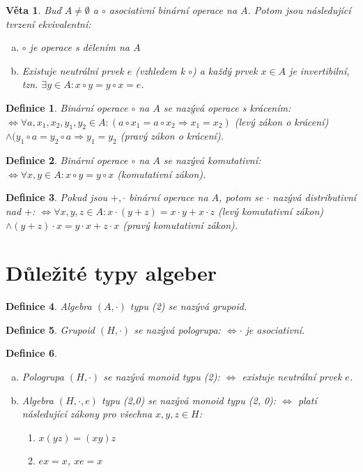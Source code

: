 \documentclass[a4paper, 11pt]{report}
\newtheorem{mydef}{Definice}[chapter]
\newtheorem{veta}{Věta}[chapter]
\begin{document}
\begin{veta}
Buď $A \not= \emptyset$ a $\circ$ asociativní binární operace na $A$. Potom jsou následující tvrzení ekvivalentní:
\begin{enumerate}[a)]
	\item $\circ$ je operace s dělením na $A$
	\item Existuje neutrální prvek $e$ (vzhledem k $\circ$) a každý prvek $x \in A$ je invertibilní, tzn. $\exists y \in A: x \circ y = y \circ x = e$.
\end{enumerate}
\end{veta}

\begin{mydef}
Binární operace $\circ$ na $A$ se nazývá operace s krácením: $\Leftrightarrow \forall a, x_1, x_2, y_1, y_2 \in A: (a \circ x_1 = a \circ x_2 \Rightarrow x_1 = x_2)$ (levý zákon o krácení) $\land (y_1 \circ a = y_2 \circ a \Rightarrow y_1 = y_2$ (pravý zákon o krácení).
\end{mydef}

\begin{mydef}
Binární operace $\circ$ na $A$ se nazývá komutativní: $\Leftrightarrow \forall x,y \in A: x \circ y = y \circ x$ (komutativní zákon).
\end{mydef}

\begin{mydef}
Pokud jsou $+, \cdot$ binární operace na $A$, potom se $\cdot$ nazývá distributivní nad $+$: $\Leftrightarrow \forall x,y,z \in A: x \cdot (y + z) = x \cdot y + x \cdot z$ (levý komutativní zákon) $\land (y + z) \cdot x = y \cdot x + z \cdot x$ (pravý komutativní zákon).
\end{mydef}

\section{Důležité typy algeber}
\begin{mydef}
Algebra $(A, \cdot)$ typu (2) se nazývá \emph{grupoid}.
\end{mydef}

\begin{mydef}
Grupoid $(H, \cdot)$ se nazývá \emph{pologrupa}: $\Leftrightarrow \cdot$ je asociativní.
\end{mydef}

\begin{mydef}
\begin{enumerate}[a)]
	\item Pologrupa $(H, \cdot)$ se nazývá \emph{monoid} typu (2): $\Leftrightarrow$ existuje neutrální prvek $e$.
	\item Algebra $(H, \cdot, e)$ typu (2,0) se nazývá \emph{monoid} typu (2, 0): $\Leftrightarrow$ platí následující zákony pro všechna $x,y,z \in H$:
	\begin{enumerate}[1)]
		\item $x(yz) = (xy)z$
		\item $ex = x$, $xe = x$
	\end{enumerate}
\end{enumerate}
\end{mydef}
\end{document}
